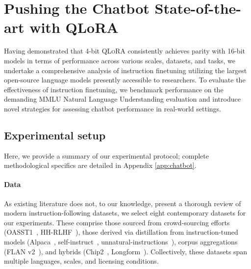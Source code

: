 \section{Pushing the Chatbot State-of-the-art with QLoRA}
\label{sec:pushing}
Having demonstrated that 4-bit \textsc{QLoRA} consistently achieves parity with 16-bit models in terms of performance across various scales, datasets, and tasks, we undertake a comprehensive analysis of instruction finetuning utilizing the largest open-source language models presently accessible to researchers. To evaluate the effectiveness of instruction finetuning, we benchmark performance on the demanding MMLU Natural Language Understanding evaluation and introduce novel strategies for assessing chatbot performance in real-world settings.

\subsection{Experimental setup} Here, we provide a summary of our experimental protocol; complete methodological specifics are detailed in Appendix \ref{app:chatbot}. 

\paragraph{Data} As existing literature does not, to our knowledge, present a thorough review of modern instruction-following datasets, we select eight contemporary datasets for our experiments. These comprise those sourced from crowd-sourcing efforts (OASST1~\citep{kopf2023openassistant}, HH-RLHF~\citep{bai2022training}), those derived via distillation from instruction-tuned models (Alpaca~\citep{alpaca}, self-instruct~\citep{wang2022self}, unnatural-instructions~\citep{honovich2022unnatural}), corpus aggregations (FLAN v2~\citep{chung2022scaling}), and hybrids (Chip2~\citep{laion2023}, Longform~\citep{koksal2023longform}). Collectively, these datasets span multiple languages, scales, and licensing conditions.

